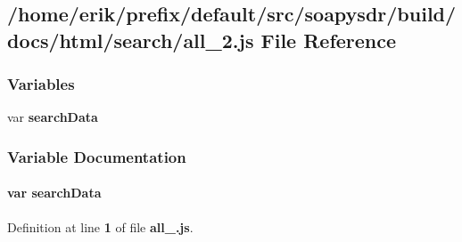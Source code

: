 \subsection{/home/erik/prefix/default/src/soapysdr/build/docs/html/search/all\+\_\+2.js File Reference}
\label{all__2_8js}
\subsubsection*{Variables}
\begin{DoxyCompactItemize}
\item 
var {\bf search\+Data}
\end{DoxyCompactItemize}


\subsubsection{Variable Documentation}
\paragraph[{search\+Data}]{\setlength{\rightskip}{0pt plus 5cm}var search\+Data}\label{all__2_8js_ad01a7523f103d6242ef9b0451861231e}


Definition at line {\bf 1} of file {\bf all\+\_.\+js}.

